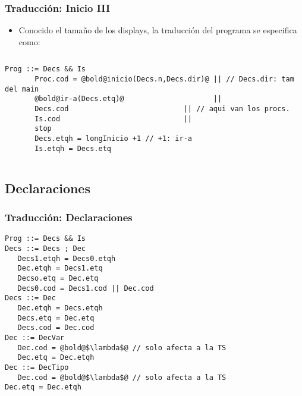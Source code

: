 \documentclass[hyperref={pdfpagelabels=false},tree-dvips,compress]{beamer}
\begin{document}
\begin{frame}[fragile]
\frametitle{Traducción: Inicio III}

\begin{itemize}
	\item Conocido el tamaño de los displays, la traducción del programa se especifica como:
\end{itemize}

\begin{columns}[T]
	\begin{lstlisting}[style=gramaticas,basicstyle=\scriptsize\ttfamily,mathescape]
	Prog ::= Decs && Is
	   Proc.cod = @bold@inicio(Decs.n,Decs.dir)@ || // Decs.dir: tam del main
	   @bold@ir-a(Decs.etq)@                     ||
	   Decs.cod                           || // aqui van los procs.
	   Is.cod                             ||
	   stop
	   Decs.etqh = longInicio +1 // +1: ir-a
	   Is.etqh = Decs.etq
	\end{lstlisting}

\end{columns}


\end{frame}
\subsection{Declaraciones}
\begin{frame}[fragile]
\frametitle{Traducción: Declaraciones}

\begin{lstlisting}[style=gramaticas,basicstyle=\scriptsize\ttfamily,mathescape]
Prog ::= Decs && Is
Decs ::= Decs ; Dec
   Decs1.etqh = Decs0.etqh
   Dec.etqh = Decs1.etq
   Decso.etq = Dec.etq
   Decs0.cod = Decs1.cod || Dec.cod
Decs ::= Dec
   Dec.etqh = Decs.etqh
   Decs.etq = Dec.etq
   Decs.cod = Dec.cod
Dec ::= DecVar
   Dec.cod = @bold@$\lambda$@ // solo afecta a la TS
   Dec.etq = Dec.etqh
Dec ::= DecTipo
   Dec.cod = @bold@$\lambda$@ // solo afecta a la TS
Dec.etq = Dec.etqh
\end{lstlisting}

\end{frame}
\end{document}
